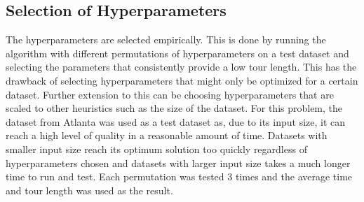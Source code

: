 \documentclass[sigconf]{acmart}
\begin{document}
\subsection{Selection of Hyperparameters}
The hyperparameters are selected empirically. This is done by running the algorithm with different permutations of hyperparameters on a test dataset and selecting the parameters that consistently provide a low tour length. This has the drawback of selecting hyperparameters that might only be optimized for a certain dataset. Further extension to this can be choosing hyperparameters that are scaled to other heuristics such as the size of the dataset.
For this problem, the dataset from Atlanta was used as a test dataset as, due to its input size, it can reach a high level of quality in a reasonable amount of time. Datasets with smaller input size reach its optimum solution too quickly regardless of hyperparameters chosen and datasets with larger input size takes a much longer time to run and test. Each permutation was tested 3 times and the average time and tour length was used as the result.
\end{document}
